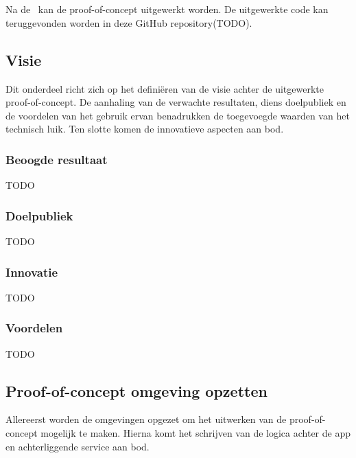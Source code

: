 
\chapter{}
\label{ch:proof-of-concept}
Na de~ kan de proof-of-concept uitgewerkt worden.
De uitgewerkte code kan teruggevonden worden in deze GitHub repository(TODO). %

\section{Visie}
\label{sec:visie}
Dit onderdeel richt zich op het defini\"eren van de visie achter de uitgewerkte proof-of-concept.
De aanhaling van de verwachte resultaten, diens doelpubliek en de voordelen van het gebruik ervan benadrukken de toegevoegde waarden van het technisch luik.
Ten slotte komen de innovatieve aspecten aan bod.

\subsection{Beoogde resultaat}
\label{subsec:doel-van-de-proof-of-concept}
TODO

\subsection{Doelpubliek}
\label{subsec:doelpubliek}
TODO

\subsection{Innovatie}
\label{subsec:innovatie}
TODO

\subsection{Voordelen}
\label{subsec:voordelen}
TODO

\section{Proof-of-concept omgeving opzetten}
\label{sec:proof-of-concept}
Allereerst worden de omgevingen opgezet om het uitwerken van de proof-of-concept mogelijk te maken.
Hierna komt het schrijven van de logica achter de app en achterliggende service aan bod.

